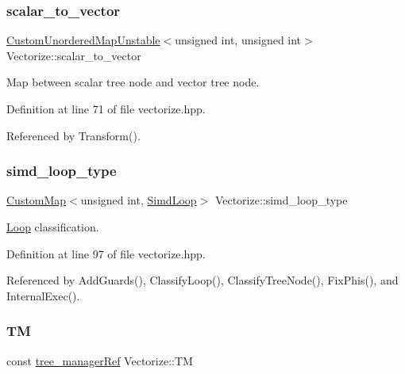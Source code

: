 \subsubsection{\texorpdfstring{scalar\+\_\+to\+\_\+vector}{scalar\_to\_vector}}
{\footnotesize\ttfamily \hyperlink{custom__map_8hpp_a8cbaceffc09790a885ec7e9c17809c69}{Custom\+Unordered\+Map\+Unstable}$<$unsigned int, unsigned int$>$ Vectorize\+::scalar\+\_\+to\+\_\+vector\hspace{0.3cm}{\ttfamily [private]}}



Map between scalar tree node and vector tree node. 



Definition at line 71 of file vectorize.\+hpp.



Referenced by Transform().

\mbox{\label{classVectorize_a449629be4c36693f9c5ca0fb74ed0068}} 
\subsubsection{\texorpdfstring{simd\+\_\+loop\+\_\+type}{simd\_loop\_type}}
{\footnotesize\ttfamily \hyperlink{custom__map_8hpp_a18ca01763abbe3e5623223bfe5aaac6b}{Custom\+Map}$<$unsigned int, \hyperlink{classVectorize_a434b71764ac7af86698c3f2cee6e8a25}{Simd\+Loop}$>$ Vectorize\+::simd\+\_\+loop\+\_\+type\hspace{0.3cm}{\ttfamily [private]}}



\hyperlink{classLoop}{Loop} classification. 



Definition at line 97 of file vectorize.\+hpp.



Referenced by Add\+Guards(), Classify\+Loop(), Classify\+Tree\+Node(), Fix\+Phis(), and Internal\+Exec().

\mbox{\label{classVectorize_ad94e0c79493654ba1a0f667d4988eb35}} 
\subsubsection{\texorpdfstring{TM}{TM}}
{\footnotesize\ttfamily const \hyperlink{tree__manager_8hpp_a96ff150c071ce11a9a7a1e40590f205e}{tree\+\_\+manager\+Ref} Vectorize\+::\+TM\hspace{0.3cm}{\ttfamily [private]}}



